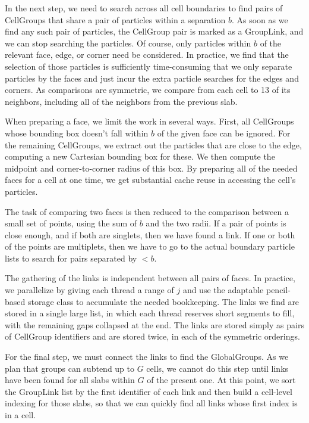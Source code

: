 In the next step, we need to search across all cell boundaries to find
pairs of CellGroups that share a pair of particles within a separation
$b$.  As soon as we find any such pair of particles, the CellGroup pair
is marked as a GroupLink, and we can stop searching the particles.
Of course, only particles within $b$ of the relevant face, edge, or 
corner need be considered.  In practice, we find that the selection of
those particles is sufficiently time-consuming that we only separate
particles by the faces and just incur the extra particle searches for
the edges and corners.  As comparisons are symmetric, we compare 
from each cell to 13 of its neighbors, including all of the neighbors
from the previous slab.  

When preparing a face, we limit the work in several ways.  First,
all CellGroups whose bounding box doesn't fall within $b$ of the 
given face can be ignored.  For the remaining CellGroups, we extract
out the particles that are close to the edge, computing a new Cartesian
bounding box for these.  We then compute the midpoint and corner-to-corner
radius of this box.  By preparing all of the needed faces for a cell
at one time, we get substantial cache reuse in accessing the cell's particles.

The task of comparing two faces is then reduced to the comparison
between a small set of points, using the sum of $b$ and the two
radii.  If a pair of points is close enough, and if both are singlets,
then we have found a link.  If one or both of the points are
multiplets, then we have to go to the actual boundary particle lists
to search for pairs separated by $<b$.

The gathering of the links is independent between all pairs of faces.
In practice, we parallelize by giving each thread a range of $j$ and
use the adaptable pencil-based storage class to accumulate the needed
bookkeeping.  The links we find are stored in a single large list, 
in which each thread reserves short segments to fill, with the 
remaining gaps collapsed at the end.  The links are stored simply
as pairs of CellGroup identifiers and are stored twice, in each of
the symmetric orderings.


For the final step, we must connect the links to find the GlobalGroups.
As we plan that groups can subtend up to $G$ cells, we cannot do
this step until links have been found for all slabs within $G$ of
the present one.  At this point, we sort the GroupLink list by the
first identifier of each link and then build a cell-level indexing
for those slabs, so that we can quickly find all links whose first
index is in a cell.


